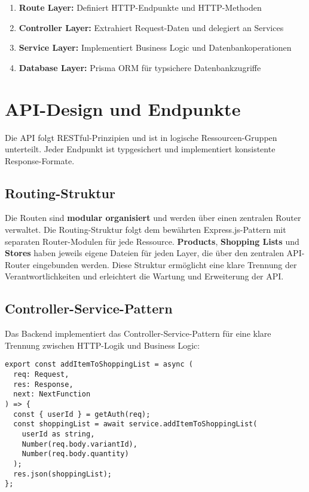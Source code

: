 \begin{enumerate}
    \item \textbf{Route Layer:} Definiert HTTP-Endpunkte und HTTP-Methoden
    \item \textbf{Controller Layer:} Extrahiert Request-Daten und delegiert an Services
    \item \textbf{Service Layer:} Implementiert Business Logic und Datenbankoperationen
    \item \textbf{Database Layer:} Prisma ORM für typsichere Datenbankzugriffe
\end{enumerate}

\section{API-Design und Endpunkte}

Die API folgt RESTful-Prinzipien und ist in logische Ressourcen-Gruppen unterteilt. Jeder Endpunkt ist typgesichert und implementiert konsistente Response-Formate.

\subsection{Routing-Struktur}

Die Routen sind \textbf{modular organisiert} und werden über einen zentralen Router verwaltet. Die Routing-Struktur folgt dem bewährten Express.js-Pattern mit separaten Router-Modulen für jede Ressource. \textbf{Products}, \textbf{Shopping Lists} und \textbf{Stores} haben jeweils eigene Dateien für jeden Layer, die über den zentralen API-Router eingebunden werden. Diese Struktur ermöglicht eine klare Trennung der Verantwortlichkeiten und erleichtert die Wartung und Erweiterung der API.

\subsection{Controller-Service-Pattern}

Das Backend implementiert das Controller-Service-Pattern für eine klare Trennung zwischen HTTP-Logik und Business Logic:

\begin{lstlisting}[style=typescriptstyle,caption={Controller-Beispiel: Shopping List}]
export const addItemToShoppingList = async (
  req: Request,
  res: Response,
  next: NextFunction
) => {
  const { userId } = getAuth(req);
  const shoppingList = await service.addItemToShoppingList(
    userId as string,
    Number(req.body.variantId),
    Number(req.body.quantity)
  );
  res.json(shoppingList);
};
\end{lstlisting}

